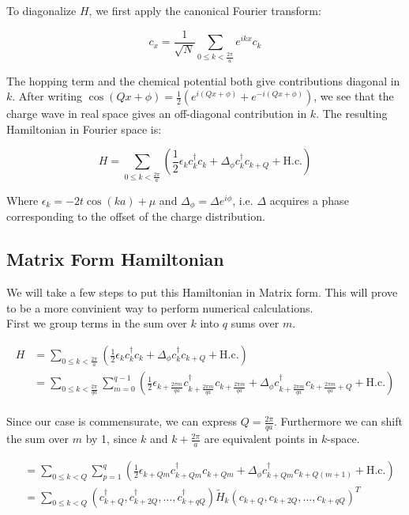 \documentclass[letterpaper, 10 pt, conference]{ieeeconf}  %
\begin{document}
To diagonalize $H$, we first apply the canonical Fourier transform:

$$c_x = \frac{1}{\sqrt{N}}\sum_{0 \leq k < \frac{2\pi}{a}}e^{ikx}c_k$$

The hopping term and the chemical potential both give contributions diagonal in $k$. After writing $\cos(Qx + \phi) = \frac{1}{2}(e^{i(Qx + \phi)} + e^{-i(Qx + \phi)}) $, we see that the charge wave in real space gives an off-diagonal contribution in $k$. The resulting Hamiltonian in Fourier space is:

$$ H = \sum_{0 \leq k < \frac{2\pi}{a}} (\frac{1}{2}\epsilon_k c_k^{\dagger}c_k + \Delta_\phi c_k^{\dagger}c_{k+Q} + \text{H.c.}) $$

Where $\epsilon_k = -2t \cos(ka) + \mu $ and $\Delta_\phi = \Delta e^{i\phi}$, i.e. $\Delta$ acquires a phase corresponding to the offset of the charge distribution.






\subsection{Matrix Form Hamiltonian}
We will take a few steps to put this Hamiltonian in Matrix form.
This will prove to be a more convinient way to perform numerical calculations.\\
First we group terms in the sum over $k$ into $q$ sums over $m$.

\begin{align*}
H &= \sum_{0 \leq k < \frac{2\pi}{a}} (\frac{1}{2}\epsilon_k c_k^{\dagger}c_k + \Delta_\phi c_k^{\dagger}c_{k+Q} + \text{H.c.})\\
&=\sum_{0 \leq k < \frac{2\pi}{qa}} \sum_{m=0}^{q-1}  (\frac{1}{2}\epsilon_{k+\frac{2\pi m}{qa}} c_{k+\frac{2\pi m}{qa}}^{\dagger}c_{k+\frac{2\pi m}{qa}} + \Delta_\phi c_{k+\frac{2\pi m}{qa}}^{\dagger}c_{k+\frac{2\pi m}{qa}+Q} + \text{H.c.})\\
\end{align*}

Since our case is commensurate, we can express $Q=\frac{2\pi}{qa}$. Furthermore we can shift the sum over $m$ by 1,
since $k$ and $k+\frac{2\pi}{a}$ are equivalent points in $k$-space.

\begin{align*}
  &=\sum_{0 \leq k < Q} \sum_{p=1}^{q}  (\frac{1}{2}\epsilon_{k+Qm} c_{k+Qm}^{\dagger}c_{k+Qm} + \Delta_\phi c_{k+Qm}^{\dagger}c_{k+Q(m+1)} + \text{H.c.})\\
  &=\sum_{0\leq k < Q} (c_{k+Q}^{\dagger},c_{k+2Q}^{\dagger},\dots,c_{k+qQ}^{\dagger})\tilde{H}_{k} (c_{k+Q},c_{k+2Q},\dots,c_{k+qQ})^{T} \\
\end{align*}
\end{document}
